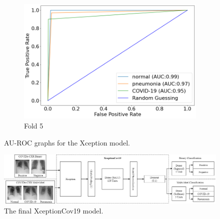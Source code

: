 \begin{figure}
     \vspace{10mm} %
     \begin{subfigure}[b]{0.49\textwidth}
         \centering
         \includegraphics[width=\textwidth]{figures/au-roc-5.png}
         \caption{Fold 5}
         \label{fig:auroc-fold-5}
     \end{subfigure}
        \caption{AU-ROC graphs for the Xception model.}
        \label{fig:au-roc-all}
\end{figure}
\begin{landscape}
    \centering
    \vspace*{\fill}
    \begin{figure}[H]
        \centering
        \includegraphics[width=1.5\textwidth]{figures/xceptioncov19.png}
        \caption{The final XceptionCov19 model.}
        \label{fig:xceptioncov19}
    \end{figure}
    \vfill
\end{landscape}